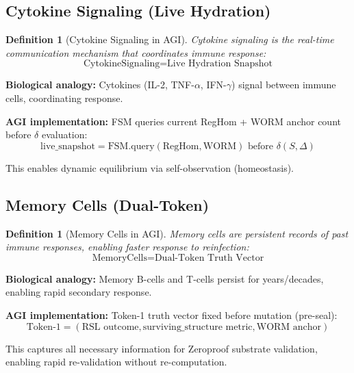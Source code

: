 \documentclass[11pt,a4paper]{article}
\newtheorem{definition}[theorem]{Definition}
\begin{document}
\subsection{Cytokine Signaling (Live Hydration)}

\begin{definition}[Cytokine Signaling in AGI]
Cytokine signaling is the real-time communication mechanism that coordinates immune response:
\begin{equation}
\text{CytokineSignaling} = \text{Live Hydration Snapshot}
\end{equation}
\end{definition}

\textbf{Biological analogy:} Cytokines (IL-2, TNF-$\alpha$, IFN-$\gamma$) signal between immune cells, coordinating response.

\textbf{AGI implementation:} FSM queries current RegHom + WORM anchor count before $\delta$ evaluation:
\begin{equation}
\text{live\_snapshot} = \text{FSM.query}(\text{RegHom}, \text{WORM}) \text{ before } \delta(S, \Delta)
\end{equation}

This enables dynamic equilibrium via self-observation (homeostasis).

\subsection{Memory Cells (Dual-Token)}

\begin{definition}[Memory Cells in AGI]
Memory cells are persistent records of past immune responses, enabling faster response to reinfection:
\begin{equation}
\text{MemoryCells} = \text{Dual-Token Truth Vector}
\end{equation}
\end{definition}

\textbf{Biological analogy:} Memory B-cells and T-cells persist for years/decades, enabling rapid secondary response.

\textbf{AGI implementation:} Token-1 truth vector fixed before mutation (pre-seal):
\begin{equation}
\text{Token-1} = (\text{RSL outcome}, \text{surviving\_structure metric}, \text{WORM anchor})
\end{equation}

This captures all necessary information for Zeroproof substrate validation, enabling rapid re-validation without re-computation.
\end{document}
